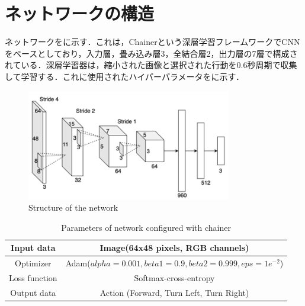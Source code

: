 
\section{ネットワークの構造}

  ネットワークをに示す．これは，Chainer\cite{chainer}という深層学習フレームワークでCNNをベースとしており，入力層，畳み込み層3，全結合層2，出力層の7層で構成されている．深層学習器は，縮小された画像と選択された行動を0.6秒周期で収集して学習する．これに使用されたハイパーパラメータをに示す．

  \begin{figure}[h]
    \centering
    \includegraphics[keepaspectratio, scale=0.70] {images/okada_network.png}
    \caption{Structure of the network \cite{okada}}
    \label{Fig:okada_network}
  \end{figure}

  \begin{table}[hbtp]
    \caption{Parameters of network configured with chainer}
    \label{tab:Parameters of network configured with chainer}
    \centering
    \begin{tabular}{|c|c|}
      \hline
      Input data & Image(64x48 pixels, RGB channels) \\
      \hline
      Optimizer & Adam($alpha = 0.001, beta1 = 0.9, beta2 =  0.999, eps = 1e^{-2}$)\\
      \hline
      Loss function & Softmax-cross-entropy\\
      \hline
      Output data & Action (Forward, Turn Left, Turn Right)\\
      \hline
    \end{tabular}
  \end{table}

\newpage